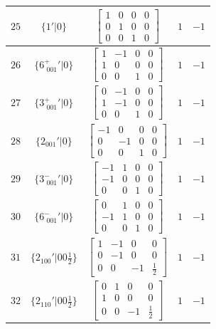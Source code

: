 \documentclass[fleqn,8pt]{jsarticle}
\begin{document}
\begin{longtable}{ccccc}
$ 25 $ & $ \{1{}'|0\} $ & $ \begin{bmatrix} 1 & 0 & 0 & 0 \\ 0 & 1 & 0 & 0 \\ 0 & 0 & 1 & 0 \end{bmatrix} $ & $ 1 $ & $ -1 $ \\ \hline
$ 26 $ & $ \{6^{+}_{\,\,001}{}'|0\} $ & $ \begin{bmatrix} 1 & -1 & 0 & 0 \\ 1 & 0 & 0 & 0 \\ 0 & 0 & 1 & 0 \end{bmatrix} $ & $ 1 $ & $ -1 $ \\ \hline
$ 27 $ & $ \{3^{+}_{\,\,001}{}'|0\} $ & $ \begin{bmatrix} 0 & -1 & 0 & 0 \\ 1 & -1 & 0 & 0 \\ 0 & 0 & 1 & 0 \end{bmatrix} $ & $ 1 $ & $ -1 $ \\ \hline
$ 28 $ & $ \{2{}_{001}{}'|0\} $ & $ \begin{bmatrix} -1 & 0 & 0 & 0 \\ 0 & -1 & 0 & 0 \\ 0 & 0 & 1 & 0 \end{bmatrix} $ & $ 1 $ & $ -1 $ \\ \hline
$ 29 $ & $ \{3^{-}_{\,\,001}{}'|0\} $ & $ \begin{bmatrix} -1 & 1 & 0 & 0 \\ -1 & 0 & 0 & 0 \\ 0 & 0 & 1 & 0 \end{bmatrix} $ & $ 1 $ & $ -1 $ \\ \hline
$ 30 $ & $ \{6^{-}_{\,\,001}{}'|0\} $ & $ \begin{bmatrix} 0 & 1 & 0 & 0 \\ -1 & 1 & 0 & 0 \\ 0 & 0 & 1 & 0 \end{bmatrix} $ & $ 1 $ & $ -1 $ \\ \hline
$ 31 $ & $ \{2{}_{100}{}'|0 0 \frac{1}{2}\} $ & $ \begin{bmatrix} 1 & -1 & 0 & 0 \\ 0 & -1 & 0 & 0 \\ 0 & 0 & -1 & \frac{1}{2} \end{bmatrix} $ & $ 1 $ & $ -1 $ \\ \hline
$ 32 $ & $ \{2{}_{110}{}'|0 0 \frac{1}{2}\} $ & $ \begin{bmatrix} 0 & 1 & 0 & 0 \\ 1 & 0 & 0 & 0 \\ 0 & 0 & -1 & \frac{1}{2} \end{bmatrix} $ & $ 1 $ & $ -1 $ \\ \hline

\end{longtable}
\end{document}
